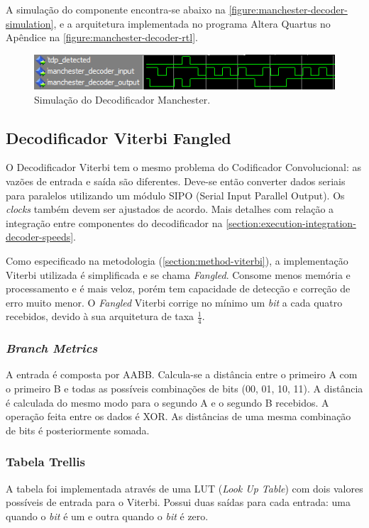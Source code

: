 	A simulação do componente encontra-se abaixo na \autoref{figure:manchester-decoder-simulation}, e a arquitetura implementada no programa Altera Quartus no Apêndice na \autoref{figure:manchester-decoder-rtl}.

	\begin{figure}[h]
		\caption{\label{figure:manchester-decoder-simulation}Simulação do Decodificador Manchester.}
		\centering
		\includegraphics[width=0.6\textheight]{manchester/simulation-decoder.png}
	\end{figure}

	\subsection{Decodificador Viterbi Fangled}

	O Decodificador Viterbi tem o mesmo problema do Codificador Convolucional: as vazões de entrada e saída são diferentes. Deve-se então converter dados seriais para paralelos utilizando um módulo SIPO (Serial Input Parallel Output). Os \textit{clocks} também devem ser ajustados de acordo. Mais detalhes com relação a integração entre componentes do decodificador na \autoref{section:execution-integration-decoder-speeds}.

	Como especificado na metodologia (\autoref{section:method-viterbi}), a implementação Viterbi utilizada é simplificada e se chama \textit{Fangled}. Consome menos memória e processamento e é mais veloz, porém tem capacidade de detecção e correção de erro muito menor. O \textit{Fangled} Viterbi corrige no mínimo um \textit{bit} a cada quatro recebidos, devido à sua arquitetura de taxa $\frac{1}{4}$.

	\subsubsection{\textit{Branch Metrics}}
	A entrada é composta por AABB. Calcula-se a distância entre o primeiro A com o primeiro B e todas as possíveis combinações de bits (00, 01, 10, 11). A distância é calculada do mesmo modo para o segundo A e o segundo B recebidos. A operação feita entre os dados é XOR. As distâncias de uma mesma combinação de bits é posteriormente somada.

	\subsubsection{Tabela Trellis}
	A tabela foi implementada através de uma LUT (\textit{Look Up Table}) com dois valores possíveis de entrada para o Viterbi. Possui duas saídas para cada entrada: uma quando o \textit{bit} é um e outra quando o \textit{bit} é zero.

